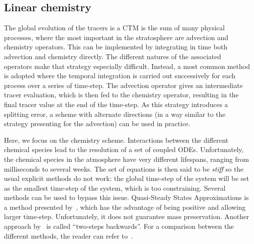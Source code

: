 \subsection{Linear chemistry}
The global evolution of the tracers is a CTM is the sum of many physical
processes, where the most important in the stratosphere are advection and chemistry
operators. This can be implemented by integrating in time both advection and
chemistry directly. The different natures of the associated operators make that
strategy especially difficult.  Instead, a most common method is adopted where
the temporal integration is carried out successively for each process over a
series of time-step. The advection operator gives an intermediate
tracer evaluation, which is then fed to the chemistry operator, resulting in the final
tracer value at the end of the time-step. As this strategy introduces a
splitting error, a scheme with alternate directions (in a way similar to the
strategy presenting for the advection) can be used in practice. 

Here, we focus on the chemistry scheme. Interactions between the different
chemical species lead to the resolution of a set of coupled \glspl{ODE}.
Unfortunately, the chemical species in the atmosphere have very different
lifespans, ranging from milliseconds to several weeks. The set of equations is
then said to be \textit{stiff} so the usual explicit methods do not work: the
global time-step of the system will be set as the smallest time-step of the
system, which is too constraining. Several methods can be used to bypass this
issue. Quasi-Steady States Approximations is a method presented
by~\cite{Hesstvedt1978}, which has the advantage of being positive and allowing
larger time-step. Unfortunately, it does not guarantee mass preservation.
Another approach by~\cite{Verwer1994} is called \enquote{two-steps backwards}. For a
comparison between the different methods, the reader can refer
to~\cite{Sandu1996}. 

